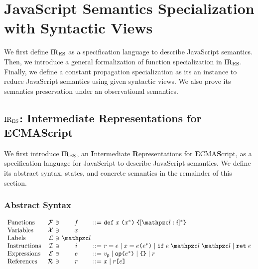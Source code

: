 \section{JavaScript Semantics Specialization with Syntactic Views}\label{sec:formal}

We first define $\text{IR}_\text{ES}$ as a specification language to describe JavaScript
semantics.  Then, we introduce a general formalization of function
specialization in $\text{IR}_\text{ES}$. Finally, we define a constant propagation
specialization as its an instance to reduce JavaScript semantics using given
syntactic views. We also prove its semantics preservation under an observational
semantics.

\subsection{$\text{IR}_\text{ES}$: Intermediate Representations for ECMAScript}

We first introduce $\text{IR}_\text{ES}$, an \textbf{I}ntermediate \textbf{R}epresentations
for \textbf{E}CMA\textbf{S}cript, as a specification language for JavaScript to
describe JavaScript semantics. We define its abstract syntax, states, and
concrete semantics in the remainder of this section.

\subsubsection{Abstract Syntax}

\[
  \begin{array}{lr@{~}c@{~}c@{~}c@{~}l}
    \text{Functions} & \funcset &\ni& \func &::=&
    \kwdef \; x \; \kwrl x^* \kwrr \; \kwcl [\lab: \inst]^* \kwcr\\

    \text{Variables} & \varset &\ni& x\\

    \text{Labels} & \labset &\ni& \lab\\

    \text{Instructions} & \instset &\ni& \inst &::=&
    \refer = \expr \mid
    x = \expr \kwrl \expr^* \kwrr \mid
    \kwif \; \expr \; \lab \; \lab \mid
    \kwret \; \expr\\

    \text{Expressions} & \exprset &\ni& \expr &::=&
    \pval \mid
    \op \kwrl \expr^* \kwrr \mid
    \kwcl \kwcr \mid
    \refer\\

    \text{References} & \referset &\ni& \refer &::=&
    x \mid \refer \kwsl \expr \kwsr\\
  \end{array}
\]

